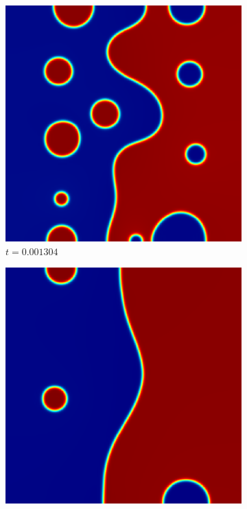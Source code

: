 \begin{figure}[ht]
	\begin{subfigure}[t]{.3\linewidth}
		\center
		\includegraphics[scale=.25]{linear_ch_6_1304}
		\vspace{-.4\baselineskip}
		\caption{$t=0.001304$}
	\end{subfigure}
	\begin{subfigure}[t]{.3\linewidth}
		\center
		\includegraphics[scale=.25]{linear_ch_7_5814}

\end{subfigure}
\end{figure}
